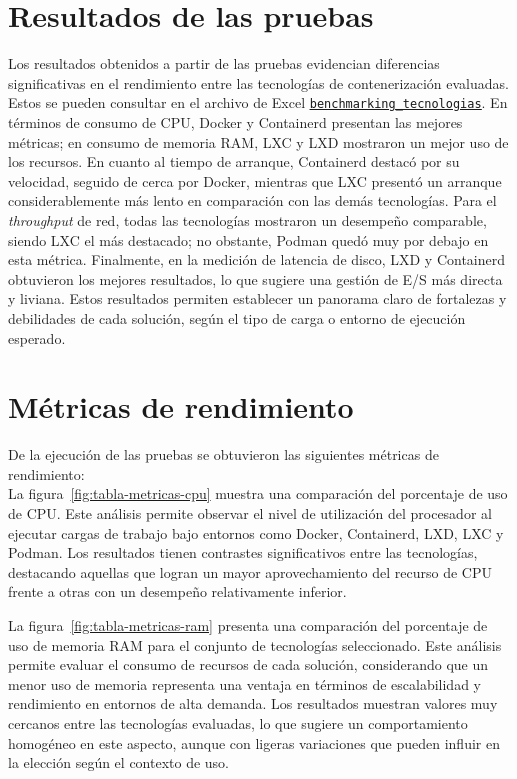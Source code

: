 \section{Resultados de las pruebas}
\noindent
Los resultados obtenidos a partir de las pruebas evidencian diferencias significativas en el rendimiento entre las tecnologías de contenerización evaluadas. Estos se pueden consultar en el archivo de Excel \underline{\href{https://docs.google.com/spreadsheets/d/1Ce37Sm3Swyfa88Ur1yQbLarq_D86obUIAGGJocgQbUE/edit?usp=sharing} {\texttt{benchmarking\_tecnologias}}}.
En términos de consumo de CPU, Docker y Containerd presentan las mejores métricas; en consumo de memoria RAM, LXC y LXD mostraron un mejor uso de los recursos. En cuanto al tiempo de arranque, Containerd destacó por su velocidad, seguido de cerca por Docker, mientras que LXC presentó un arranque considerablemente más lento en comparación con las demás tecnologías.
Para el \textit{throughput} de red, todas las tecnologías mostraron un desempeño comparable, siendo LXC el más destacado; no obstante, Podman quedó muy por debajo en esta métrica. Finalmente, en la medición de latencia de disco, LXD y Containerd obtuvieron los mejores resultados, lo que sugiere una gestión de E/S más directa y liviana.
Estos resultados permiten establecer un panorama claro de fortalezas y debilidades de cada solución, según el tipo de carga o entorno de ejecución esperado.

\section{Métricas de rendimiento}
\noindent
De la ejecución de las pruebas se obtuvieron las siguientes métricas de rendimiento: \\

\noindent
La figura~\ref{fig:tabla-metricas-cpu} muestra una comparación del porcentaje de uso de CPU. Este análisis permite observar el nivel de utilización del procesador al ejecutar cargas de trabajo bajo entornos como Docker, Containerd, LXD, LXC y Podman. Los resultados tienen contrastes significativos entre las tecnologías, destacando aquellas que logran un mayor aprovechamiento del recurso de CPU frente a otras con un desempeño relativamente inferior.


\noindent
La figura~\ref{fig:tabla-metricas-ram} presenta una comparación del porcentaje de uso de memoria RAM para el conjunto de tecnologías seleccionado. Este análisis permite evaluar el consumo de recursos de cada solución, considerando que un menor uso de memoria representa una ventaja en términos de escalabilidad y rendimiento en entornos de alta demanda. Los resultados muestran valores muy cercanos entre las tecnologías evaluadas, lo que sugiere un comportamiento homogéneo en este aspecto, aunque con ligeras variaciones que pueden influir en la elección según el contexto de uso.


